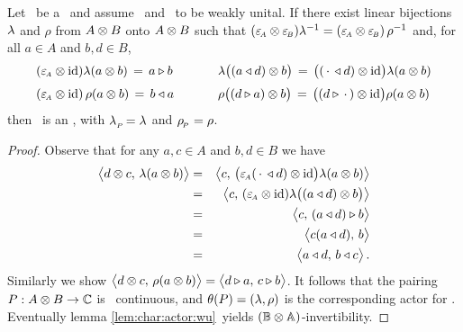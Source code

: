 \begin{lemma_sec} \label{lem:from_dpa_to_invertible_dpa}
Let\/ \pairAB\ be a \dpa\ and assume\/ \Aa\ and\/ \BB\ to be weakly unital.
If there exist linear bijections\/ $\lambda$ and\/ $\rho$ from\/ $A\otimes B$ onto\/ $A\otimes B$
such that\/ $(\varepsilon_{\scriptscriptstyle \! A}\otimes \varepsilon_{\scriptscriptstyle \! B})\lambda^{-1} = (\varepsilon_{\scriptscriptstyle \! A}\otimes \varepsilon_{\scriptscriptstyle \! B})\, \rho^{-1}$ and,
for all\/ $a\in A$ and\/ $b,d \in B$,
$$ \begin{array}{lcl}
   (\epsA \tens \id)\lam(a \tens b) \,=\, a \lact b
&\hspace{1.5em}&
   \lam\!\left((a \ract d) \tens b \vertM\right)
      \,=\, \left(( \,\cdot \,\ract d) \tens \id \vertM\right) \! \lam(a \tens b)
\\
   (\epsA \tens \id)\,\rho(a \tens b) \,=\, b \ract a
&&
   \rho\!\left((d \lact a)  \tens b \vertM\right)
      \,=\, \left((d \lact \,\cdot \,) \tens \id \vertM\right) \! \rho(a \tens b)
   \vertXL
\end{array}$$
then\/ \pairAB\ is an \idpa, with\/ $\lambda_{_P\!}=\lambda$ and\/ $\rho_{_{\!P}}=\rho$.
\end{lemma_sec}
\begin{proof}
Observe that for any $a,c \in A$ and $b,d \in B$ we have
\begin{eqnarray*}
\pairM{d \tens c}{\lam(a \tens b)}
&=&
\pairM{c}{\left(\epsA( \,\cdot \,\ract d) \tens \id \vertM\right) \! \lam(a \tens b)}
\\&=&
\pairM{c}{(\epsA \tens \id) \lam\!\left((a \ract d) \tens b \vertM\right)}
\\&=&
\pairM{c}{(a \ract d) \lact b}
\\&=&
\pairM{c(a \ract d)}{b}
\\&=&
\pairM{a \ract d}{b \ract c}.
\end{eqnarray*}
Similarly we show $\pairM{d \tens c}{\rho(a \tens b)} = \pairM{d \lact a}{c \lact b}$.
It follows that the pairing $P:A \otimes B \rightarrow \mathbb{C}$ is \stricta\ continuous,
and $\theta(P) = (\lambda,\rho)$ is the corresponding actor for \BBAA\@.
Eventually lemma \ref{lem:char:actor:wu}\ yields $(\mathbb{B} \otimes \mathbb{A})$-invertibility.
\end{proof}
